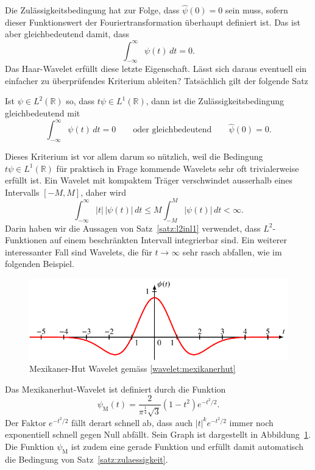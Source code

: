 Die Zulässigkeitsbedingung hat zur Folge, dass $\hat{\psi}(0)=0$ sein muss,
sofern dieser Funktionswert der Fouriertransformation überhaupt
definiert ist.
Das ist aber gleichbedeutend damit, dass 
\[
\int_{-\infty}^\infty \psi(t)\,dt = 0.
\]
Das Haar-Wavelet erfüllt diese letzte Eigenschaft.
Lässt sich daraus eventuell ein einfacher zu überprüfendes Kriterium
ableiten?
Tatsächlich gilt der folgende Satz

\begin{satz}
\label{satz:zulaessigkeit}
Ist $\psi \in L^2(\mathbb R)$ so, dass $t\psi\in L^1(\mathbb R)$, dann
ist die Zulässigkeitsbedingung gleichbedeutend mit
\[
\int_{-\infty}^\infty \psi(t)\,dt = 0
\qquad\text{oder gleichbedeutend}\qquad
\hat{\psi}(0)=0.
\]
\end{satz}


Dieses Kriterium ist vor allem darum so nützlich, weil die Bedingung
$t\psi\in L^1(\mathbb R)$ für praktisch in Frage kommende Wavelets sehr
oft trivialerweise erfüllt ist.
Ein Wavelet mit kompaktem Träger verschwindet ausserhalb eines Intervalls
$[-M,M]$, daher wird 
\[
\int_{-\infty}^\infty |t|\,|\psi(t)|\,dt
\le 
M \int_{-M}^M |\psi(t)|\,dt < \infty.
\]
Darin haben wir die Aussagen von Satz~\ref{satz:l2inl1} verwendet,
dass $L^2$-Funktionen auf einem beschränkten Intervall integrierbar sind.
Ein weiterer interessanter Fall sind Wavelets, die für $t\to\infty$
sehr rasch abfallen, wie im folgenden Beispiel.

\begin{beispiel}
\begin{figure}
\centering
\includegraphics{chapters/4-cwt/images/mexican.pdf}
\caption{Mexikaner-Hut Wavelet gemäss
\eqref{wavelet:mexikanerhut}
\label{wavelet:mexikanerhut:graph}}
\end{figure}
Das Mexikanerhut-Wavelet ist definiert durch die Funktion
\begin{equation}
\psi_{\text{M}}(t) = \frac{2}{\pi^{\frac14}\sqrt{3}}(1-t^2) e^{-t^2/2}.
\label{wavelet:mexikanerhut}
\end{equation}
Der Faktor $e^{-t^2/2}$ fällt derart schnell ab, dass auch $|t|^k e^{-t^2/2}$
immer noch exponentiell schnell gegen Null abfällt.
Sein Graph ist dargestellt in Abbildung~\ref{wavelet:mexikanerhut:graph}.
Die Funktion $\psi_{\text{M}}$ ist zudem eine gerade Funktion und %
erfüllt damit automatisch die Bedingung von Satz~\ref{satz:zulaessigkeit}.
\end{beispiel}

